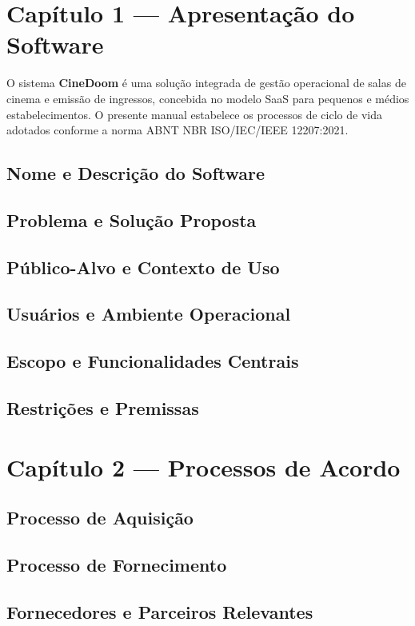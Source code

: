 \documentclass[12pt,a4paper]{article}
\begin{document}
\section{Capítulo 1 --- Apresentação do Software}
O sistema \textbf{CineDoom} é uma solução integrada de gestão operacional de salas de cinema e emissão de ingressos, concebida no modelo SaaS para pequenos e médios estabelecimentos. O presente manual estabelece os processos de ciclo de vida adotados conforme a norma ABNT NBR ISO/IEC/IEEE 12207:2021.

\subsection{Nome e Descrição do Software}
\subsection{Problema e Solução Proposta}
\subsection{Público-Alvo e Contexto de Uso}
\subsection{Usuários e Ambiente Operacional}
\subsection{Escopo e Funcionalidades Centrais}
\subsection{Restrições e Premissas}

\section{Capítulo 2 --- Processos de Acordo}
\subsection{Processo de Aquisição}
\subsection{Processo de Fornecimento}
\subsection{Fornecedores e Parceiros Relevantes}
\end{document}
